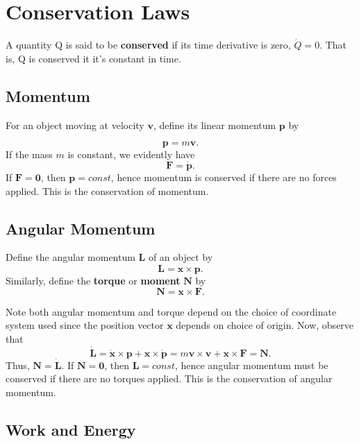 \documentclass[
  letterpaper,
  DIV=11,
  numbers=noendperiod]{scrreprt}
\begin{document}
\hypertarget{conservation-laws}{%
\section{Conservation Laws}\label{conservation-laws}}

A quantity Q is said to be \textbf{conserved} if its time derivative is
zero, \(\dot Q = 0\). That is, Q is conserved it it's constant in time.

\hypertarget{momentum}{%
\subsection{Momentum}\label{momentum}}

For an object moving at velocity \(\mathbf{v}\), define its linear
momentum \(\mathbf{p}\) by

\[
\mathbf{p} = m \mathbf{v}.
\] If the mass \(m\) is constant, we evidently have \[
\mathbf{F} = \mathbf{\dot p}.
\] If \(\mathbf{F} = \mathbf{0}\), then \(\mathbf{p}=const\), hence
momentum is conserved if there are no forces applied. This is the
conservation of momentum.

\hypertarget{angular-momentum}{%
\subsection{Angular Momentum}\label{angular-momentum}}

Define the angular momentum \(\mathbf{L}\) of an object by \[
\mathbf{L} = \mathbf{x} \times \mathbf{p}.
\] Similarly, define the \textbf{torque} or \textbf{moment}
\(\mathbf{N}\) by \[\mathbf{N} = \mathbf{x} \times \mathbf{F}.\]

Note both angular momentum and torque depend on the choice of coordinate
system used since the position vector \(\mathbf{x}\) depends on choice
of origin. Now, observe that \[
\mathbf{\dot L} = \mathbf{\dot x} \times \mathbf{p} + \mathbf{x} \times \mathbf{\dot p} = m \mathbf{v} \times \mathbf{v} + \mathbf{x} \times \mathbf{F} = \mathbf{N}.
\] Thus, \(\mathbf{N} = \mathbf{\dot L}\). If
\(\mathbf{N} = \mathbf{0}\), then \(\mathbf{L}=const\), hence angular
momentum must be conserved if there are no torques applied. This is the
conservation of angular momentum.

\hypertarget{work-and-energy}{%
\subsection{Work and Energy}\label{work-and-energy}}
\end{document}
